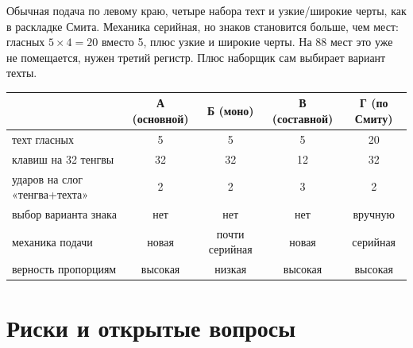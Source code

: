 \documentclass[11pt,a4paper]{article}
\begin{document}
Обычная подача по левому краю, четыре набора техт и узкие/широкие черты, как в раскладке Смита. Механика серийная, но знаков становится больше, чем мест: гласных $5\times4 = 20$ вместо 5, плюс узкие и широкие черты. На 88 мест это уже не помещается, нужен третий регистр. Плюс наборщик сам выбирает вариант техты.

\begin{center}\small
\begin{tabular}{@{}lcccc@{}}
\toprule
& А (основной) & Б (моно) & В (составной) & Г (по Смиту) \\
\midrule
техт гласных & 5 & 5 & 5 & 20 \\
клавиш на 32 тенгвы & 32 & 32 & 12 & 32 \\
ударов на слог «тенгва+техта» & 2 & 2 & 3 & 2 \\
выбор варианта знака & нет & нет & нет & вручную \\
механика подачи & новая & почти серийная & новая & серийная \\
верность пропорциям & высокая & низкая & высокая & высокая \\
\bottomrule
\end{tabular}
\end{center}

\section{Риски и открытые вопросы}
\label{sec:risks}
\end{document}
